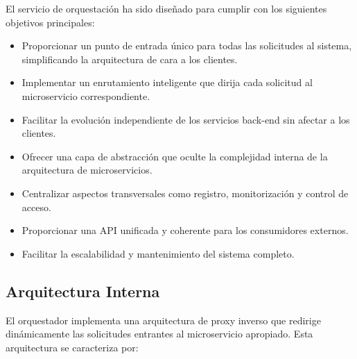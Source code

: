 \documentclass[12pt,a4paper]{article}
\begin{document}
El servicio de orquestación ha sido diseñado para cumplir con los siguientes objetivos principales:

\begin{itemize}
    \item Proporcionar un punto de entrada único para todas las solicitudes al sistema, simplificando la arquitectura de cara a los clientes.
    
    \item Implementar un enrutamiento inteligente que dirija cada solicitud al microservicio correspondiente.
    
    \item Facilitar la evolución independiente de los servicios back-end sin afectar a los clientes.
    
    \item Ofrecer una capa de abstracción que oculte la complejidad interna de la arquitectura de microservicios.
    
    \item Centralizar aspectos transversales como registro, monitorización y control de acceso.
    
    \item Proporcionar una API unificada y coherente para los consumidores externos.
    
    \item Facilitar la escalabilidad y mantenimiento del sistema completo.
\end{itemize}

\subsection{Arquitectura Interna}
\label{subsec:os-arquitectura-interna}

El orquestador implementa una arquitectura de proxy inverso que redirige dinámicamente las solicitudes entrantes al microservicio apropiado. Esta arquitectura se caracteriza por:
\end{document}
